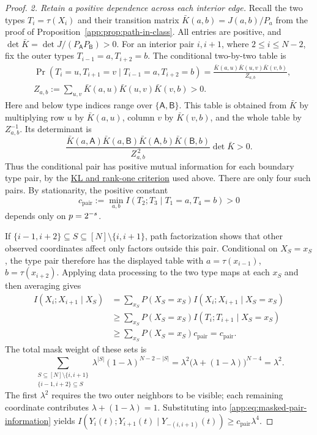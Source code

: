 \begin{proof}
\emph{2. Retain a positive dependence across each interior edge.}
Recall the two types $T_i=\tau(X_i)$ and their transition matrix
$\bar K(a,b)=J(a,b)/P_a$ from the proof of
Proposition~\ref{app:prop:path-in-class}.
All entries are positive, and
$\det\bar K=\det J/(P_{\mathsf A}P_{\mathsf B})>0$.
For an interior pair $i,i+1$, where $2\le i\le N-2$, fix the outer
types $T_{i-1}=a,T_{i+2}=b$.
The conditional two-by-two table is
\begin{align*}
 &\Pr(T_i=u,T_{i+1}=v\mid T_{i-1}=a,T_{i+2}=b)
 =\frac{\bar K(a,u)\bar K(u,v)\bar K(v,b)}{Z_{a,b}},\\
 &Z_{a,b}:=\sum_{u,v}\bar K(a,u)\bar K(u,v)\bar K(v,b)>0.
\end{align*}
Here and below type indices range over $\{\mathsf A,\mathsf B\}$.
This table is obtained from $\bar K$ by multiplying row $u$ by
$\bar K(a,u)$, column $v$ by $\bar K(v,b)$, and the whole table
by $Z_{a,b}^{-1}$. Its determinant is
\[
 \frac{\bar K(a,\mathsf A)\bar K(a,\mathsf B)
       \bar K(\mathsf A,b)\bar K(\mathsf B,b)}
      {Z_{a,b}^{\,2}}\det\bar K>0.
\]
Thus the conditional pair has positive mutual information for each
boundary type pair, by the \hyperlink{app-positive-pair-mi}{KL and rank-one
criterion} used above.  There are only four such pairs.  By stationarity,
the positive constant
\[
 c_{\mathrm{pair}}
 :=\min_{a,b}I(T_2;T_3\mid T_1=a,T_4=b)>0
\]
depends only on $p=2^{-s}$.

If $\{i-1,i+2\}\subseteq S\subseteq[N]\setminus\{i,i+1\}$,
path factorization shows that other
observed coordinates affect only factors outside this pair.
Conditional on $X_S=x_S$, the type pair therefore has the displayed
table with $a=\tau(x_{i-1})$, $b=\tau(x_{i+2})$.
Applying data processing to the two type maps at each $x_S$ and then
averaging gives
\begin{align*}
 I(X_i;X_{i+1}\mid X_S)
 &=\sum_{x_S}P(X_S=x_S)
       I(X_i;X_{i+1}\mid X_S=x_S)\\
 &\ge\sum_{x_S}P(X_S=x_S)
       I(T_i;T_{i+1}\mid X_S=x_S)\\
 &\ge\sum_{x_S}P(X_S=x_S)c_{\mathrm{pair}}
 =c_{\mathrm{pair}}.
\end{align*}
The total mask weight of these sets is
\[
 \sum_{\substack{S\subseteq[N]\setminus\{i,i+1\}\\
                 \{i-1,i+2\}\subseteq S}}
   \lambda^{|S|}(1-\lambda)^{N-2-|S|}
 =\lambda^2\bigl(\lambda+(1-\lambda)\bigr)^{N-4}
 =\lambda^2.
\]
The first $\lambda^2$ requires the two outer neighbors to be visible;
each remaining coordinate contributes $\lambda+(1-\lambda)=1$.
Substituting into \eqref{app:eq:masked-pair-information} yields
$I(Y_i(t);Y_{i+1}(t)\mid Y_{-(i,i+1)}(t))
 \ge c_{\mathrm{pair}}\lambda^4$.


\end{proof}
